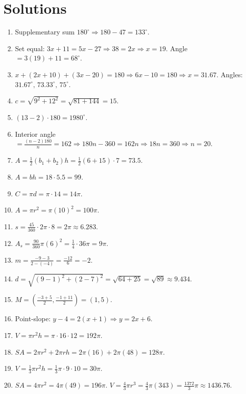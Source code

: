 \documentclass[11pt]{article}
\newcommand{\degree}{^\circ}
\begin{document}
\newpage
\section*{Solutions}
\begin{enumerate}
\item Supplementary sum \(180\degree\Rightarrow 180-47=133\degree\).
\item Set equal: \(3x+11=5x-27\Rightarrow 38=2x\Rightarrow x=19\). Angle \(=3(19)+11=68\degree\).
\item \(x+(2x+10)+(3x-20)=180\Rightarrow 6x-10=180\Rightarrow x=31.67\). Angles: \(31.67\degree,\,73.33\degree,\,75\degree\).
\item \(c=\sqrt{9^2+12^2}=\sqrt{81+144}=15\).
\item \((13-2)\cdot 180=1980\degree\).
\item Interior angle \(=\frac{(n-2)180}{n}=162\Rightarrow 180n-360=162n\Rightarrow 18n=360\Rightarrow n=20\).
\item \(A=\tfrac12(b_1+b_2)h=\tfrac12(6+15)\cdot 7=73.5\).
\item \(A=bh=18\cdot 5.5=99\).
\item \(C=\pi d=\pi\cdot 14=14\pi\).
\item \(A=\pi r^2=\pi(10)^2=100\pi\).
\item \(s=\frac{45}{360}\cdot 2\pi\cdot 8=2\pi\approx 6.283\).
\item \(A_s=\frac{90}{360}\pi(6)^2=\tfrac14\cdot 36\pi=9\pi\).
\item \(m=\frac{-9-3}{2-(-4)}=\frac{-12}{6}=-2\).
\item \(d=\sqrt{(9-1)^2+(2-7)^2}=\sqrt{64+25}=\sqrt{89}\approx 9.434\).
\item \(M=\left(\tfrac{-3+5}{2},\tfrac{-1+11}{2}\right)=(1,5)\).
\item Point-slope: \(y-4=2(x+1)\Rightarrow y=2x+6\).
\item \(V=\pi r^2h=\pi\cdot 16\cdot 12=192\pi\).
\item \(SA=2\pi r^2+2\pi rh=2\pi(16)+2\pi(48)=128\pi\).
\item \(V=\tfrac13\pi r^2h=\tfrac13\pi\cdot 9\cdot 10=30\pi\).
\item \(SA=4\pi r^2=4\pi(49)=196\pi\). \(V=\tfrac{4}{3}\pi r^3=\tfrac{4}{3}\pi(343)=\tfrac{1372}{3}\pi\approx 1436.76\).
\end{enumerate}
\end{document}
